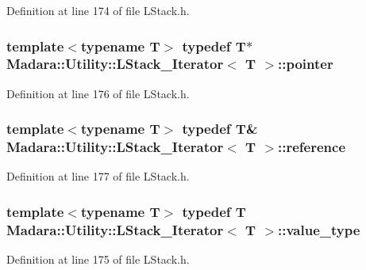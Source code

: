 Definition at line 174 of file LStack.h.

\hypertarget{classMadara_1_1Utility_1_1LStack__Iterator_af97fee752dd14c7a0f5354876b8cc15d}{
\subsubsection[{pointer}]{\setlength{\rightskip}{0pt plus 5cm}template$<$typename T$>$ typedef T$\ast$ {\bf Madara::Utility::LStack\_\-Iterator}$<$ T $>$::{\bf pointer}}}
\label{df/d6e/classMadara_1_1Utility_1_1LStack__Iterator_af97fee752dd14c7a0f5354876b8cc15d}


Definition at line 176 of file LStack.h.

\hypertarget{classMadara_1_1Utility_1_1LStack__Iterator_ae3035f9385bc079744ff9790ee82c355}{
\subsubsection[{reference}]{\setlength{\rightskip}{0pt plus 5cm}template$<$typename T$>$ typedef T\& {\bf Madara::Utility::LStack\_\-Iterator}$<$ T $>$::{\bf reference}}}
\label{df/d6e/classMadara_1_1Utility_1_1LStack__Iterator_ae3035f9385bc079744ff9790ee82c355}


Definition at line 177 of file LStack.h.

\hypertarget{classMadara_1_1Utility_1_1LStack__Iterator_a2634ce35c8f08e96e09320a7ebf364b8}{
\subsubsection[{value\_\-type}]{\setlength{\rightskip}{0pt plus 5cm}template$<$typename T$>$ typedef T {\bf Madara::Utility::LStack\_\-Iterator}$<$ T $>$::{\bf value\_\-type}}}
\label{df/d6e/classMadara_1_1Utility_1_1LStack__Iterator_a2634ce35c8f08e96e09320a7ebf364b8}


Definition at line 175 of file LStack.h.



